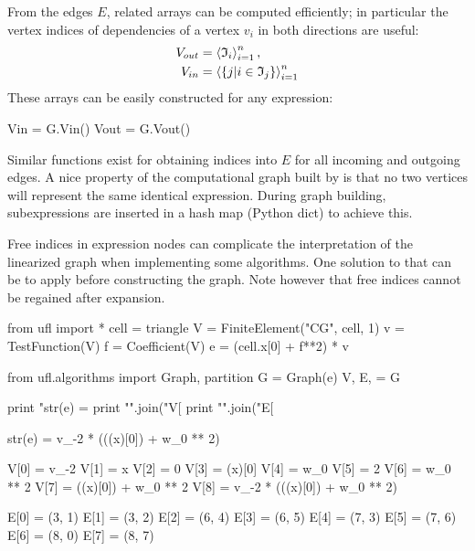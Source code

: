 From the edges $E$, related arrays can be computed efficiently; in
particular the vertex indices of dependencies of a vertex $v_i$ in
both directions are useful:
\begin{align}
\begin{split}
V_{out} &= \left\langle{\mathfrak{I}_i}\right\rangle_{i=1}^{n}, \\
V_{in}  &= \left\langle{\{ j | i \in \mathfrak{I}_j \}}\right\rangle_{i=1}^{n}
\end{split}
\end{align}
These arrays can be easily constructed for any expression:
\begin{python}
Vin = G.Vin()
Vout = G.Vout()
\end{python}
Similar functions exist for obtaining indices into $E$ for all
incoming and outgoing edges.
A nice property of the computational graph built by \ufl{} is that no
two vertices will represent the same identical expression.  During
graph building, subexpressions are inserted in a hash map (Python
dict) to achieve this.

Free indices in expression nodes can complicate the interpretation of
the linearized graph when implementing some algorithms.  One solution
to that can be to apply  before constructing
the graph. Note however that free indices cannot be regained after
expansion.

\begin{python}
from ufl import *
cell = triangle
V = FiniteElement("CG", cell, 1)
v = TestFunction(V)
f = Coefficient(V)
e = (cell.x[0] + f**2) * v

from ufl.algorithms import Graph, partition
G = Graph(e)
V, E, = G

print "str(e) = %
print "\n".join("V[%
print "\n".join("E[%
\end{python}

\begin{code}
str(e) = v_{-2} * (((x)[0]) + w_0 ** 2)

V[0] = v_{-2}
V[1] = x
V[2] = 0
V[3] = (x)[0]
V[4] = w_0
V[5] = 2
V[6] = w_0 ** 2
V[7] = ((x)[0]) + w_0 ** 2
V[8] = v_{-2} * (((x)[0]) + w_0 ** 2) 

E[0] = (3, 1)
E[1] = (3, 2)
E[2] = (6, 4)
E[3] = (6, 5)
E[4] = (7, 3)
E[5] = (7, 6)
E[6] = (8, 0)
E[7] = (8, 7) 
\end{code}

